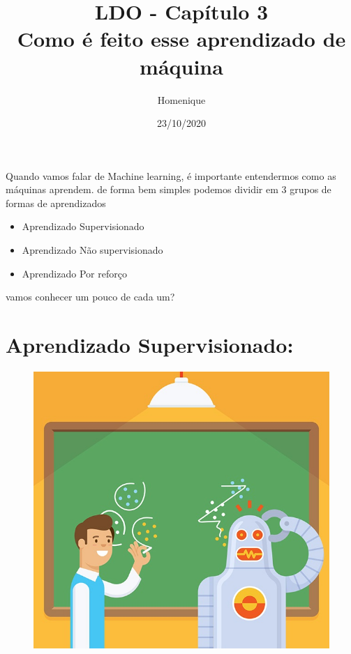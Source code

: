 \documentclass[12pt]{article}
\title{\textbf{LDO - Capítulo 3\\
Como é feito esse aprendizado de máquina}}
\author{Homenique}
\date{23/10/2020}
\begin{document}
    \maketitle

    Quando vamos falar de Machine learning, é importante entendermos como as máquinas aprendem. de forma bem simples podemos dividir em 3 grupos de formas de aprendizados 
    \begin{itemize}
    \item 
    Aprendizado Supervisionado 
    \item Aprendizado Não supervisionado
    \item Aprendizado Por reforço
    \end{itemize}
    vamos conhecer um pouco de cada um?
    
            \section*{\centering Aprendizado Supervisionado:}\label{sec:Aprendizado_Supervisionado}
            
            \begin{figure}[ht]
            \centering
            \includegraphics[scale=0.4]{robo_aprendedo.jpg}               
            \end{figure}
            
\end{document}
